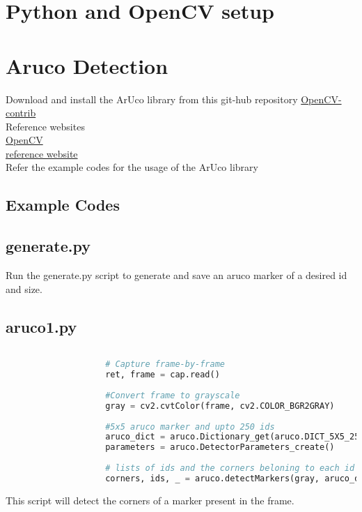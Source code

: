 \section{Python and OpenCV setup}
	
	\section{Aruco Detection}
			Download and install the ArUco library from this git-hub repository \href{https://github.com/skvark/opencv-python}{OpenCV-contrib}\\
			Reference websites\\
			\href{http://docs.opencv.org/3.1.0/d5/dae/tutorial_aruco_detection.html}{OpenCV}\\
			\href{http://www.philipzucker.com/aruco-in-opencv/}{reference website}\\
			
			Refer the example codes for the usage of the ArUco library
		\subsection{Example Codes}
			\subsection{generate.py}
				Run the generate.py script to generate and save an aruco marker of a desired id and size.\\
			\subsection{aruco1.py}
				\begin{lstlisting}[language=Python, caption = Recognising the ArUco markers]
				
					# Capture frame-by-frame
					ret, frame = cap.read()
				
					#Convert frame to grayscale
					gray = cv2.cvtColor(frame, cv2.COLOR_BGR2GRAY)
					
					#5x5 aruco marker and upto 250 ids
					aruco_dict = aruco.Dictionary_get(aruco.DICT_5X5_250)
					parameters = aruco.DetectorParameters_create()
				
					# lists of ids and the corners beloning to each id
					corners, ids, _ = aruco.detectMarkers(gray, aruco_dict, parameters=parameters)
				\end{lstlisting}
				
				This script will detect the corners of a marker present in the frame.
				

